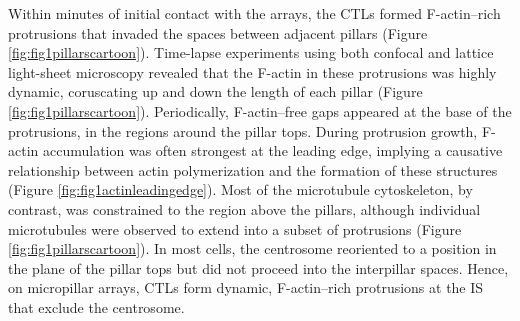 Within minutes of initial contact with the arrays, the CTLs formed F-actin–rich protrusions that invaded the spaces between adjacent pillars (Figure \ref{fig:fig1pillarscartoon}). Time-lapse experiments using both confocal and lattice light-sheet microscopy revealed that the F-actin in these protrusions was highly dynamic, coruscating up and down the length of each pillar (Figure \ref{fig:fig1pillarscartoon}). Periodically, F-actin–free gaps appeared at the base of the protrusions, in the regions around the pillar tops. During protrusion growth, F-actin accumulation was often strongest at the leading edge, implying a causative relationship between actin polymerization and the formation of these structures (Figure \ref{fig:fig1actinleadingedge}). Most of the microtubule cytoskeleton, by contrast, was constrained to the region above the pillars, although individual microtubules were observed to extend into a subset of protrusions (Figure \ref{fig:fig1pillarscartoon}). In most cells, the centrosome reoriented to a position in the plane of the pillar tops but did not proceed into the interpillar spaces. Hence, on micropillar arrays, CTLs form dynamic, F-actin–rich protrusions at the IS that exclude the centrosome.

